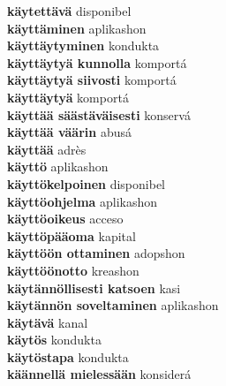 \textbf{ käytettävä  } disponibel \\
\textbf{ käyttäminen  } aplikashon \\
\textbf{ käyttäytyminen  } kondukta \\
\textbf{ käyttäytyä kunnolla  } komportá \\
\textbf{ käyttäytyä siivosti  } komportá \\
\textbf{ käyttäytyä  } komportá \\
\textbf{ käyttää säästäväisesti  } konservá \\
\textbf{ käyttää väärin  } abusá \\
\textbf{ käyttää  } adrès \\
\textbf{ käyttö  } aplikashon \\
\textbf{ käyttökelpoinen  } disponibel \\
\textbf{ käyttöohjelma  } aplikashon \\
\textbf{ käyttöoikeus  } acceso \\
\textbf{ käyttöpääoma  } kapital \\
\textbf{ käyttöön ottaminen  } adopshon \\
\textbf{ käyttöönotto  } kreashon \\
\textbf{ käytännöllisesti katsoen  } kasi \\
\textbf{ käytännön soveltaminen  } aplikashon \\
\textbf{ käytävä  } kanal \\
\textbf{ käytös  } kondukta \\
\textbf{ käytöstapa  } kondukta \\
\textbf{ käännellä mielessään  } konsiderá \\
